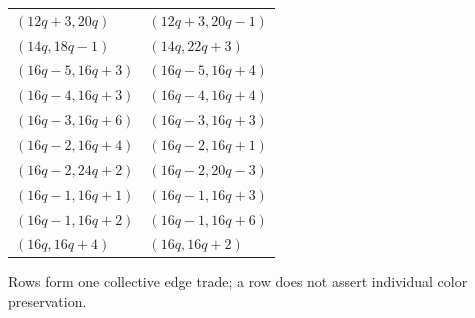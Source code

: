 \begin{longtable}{ll}
$(12q+3,20q)$ & $(12q+3,20q-1)$\\
$(14q,18q-1)$ & $(14q,22q+3)$\\
$(16q-5,16q+3)$ & $(16q-5,16q+4)$\\
$(16q-4,16q+3)$ & $(16q-4,16q+4)$\\
$(16q-3,16q+6)$ & $(16q-3,16q+3)$\\
$(16q-2,16q+4)$ & $(16q-2,16q+1)$\\
$(16q-2,24q+2)$ & $(16q-2,20q-3)$\\
$(16q-1,16q+1)$ & $(16q-1,16q+3)$\\
$(16q-1,16q+2)$ & $(16q-1,16q+6)$\\
$(16q,16q+4)$ & $(16q,16q+2)$\\
\end{longtable}
Rows form one collective edge trade; a row does not assert individual color preservation.
